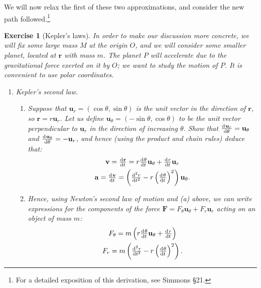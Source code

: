 \documentclass[a4paper,leqno,9pt]{article}
\theoremstyle{exercise}
\newtheorem{Exercise}{Exercise}
\newenvironment{exercise}
  {\begin{mdframed}\begin{Exercise}}
  {\end{Exercise}\end{mdframed}}
\theoremstyle{plain}
\theoremstyle{definition}
\theoremstyle{remark}
\renewcommand\vec{\mathbf}
\begin{document}
We will now relax the first of these two approximations, and consider the new path followed.\footnote{For a detailed
exposition of this derivation, see Simmons \S21.}
\begin{exercise}[Kepler's laws]
  In order to make our discussion more concrete, we will fix some large mass $ M $ at the origin $ O $, and we
  will consider some smaller planet, located at $ \vec{r} $ with mass $ m $. The planet $ P $ will accelerate due to
  the gravitational force exerted on it by $ O $; we want to study the motion of $ P $. It is convenient to use
  polar coordinates.

  \begin{enumerate}
    \item Kepler's second law.
      \begin{enumerate}
        \item Suppose that $ \vec{u}_r = (\cos \theta, \sin \theta) $ is the unit vector in the direction of $ \vec{r} $, so $ \vec{r} = r\vec{u}_r $.
              Let us define $ \vec{u}_\theta = (-\sin\theta, \cos \theta) $ to be the unit vector perpendicular to $ \vec{u}_r $ in the direction
              of increasing $ \theta $. Show that $ \od{\vec{u}_r}{\theta} = \vec{u}_\theta $ and $ \od{\vec{u}_\theta}{\theta} = -\vec{u}_r $, and hence (using
              the product and chain rules) deduce that:
              \begin{gather*}
                \vec{v} = \od{\vec{r}}{t} = r \od{\theta}{t} \vec{u}_\theta + \od{r}{t} \vec{u}_r\\
                \vec{a} = \od{\vec{v}}{t} = \left( \od[2]{r}{t} - r \left(\od{\theta}{t}\right)^2 \right)\vec{u}_\theta.
              \end{gather*}
        \item Hence, using Newton's second law of motion and (a) above, we can write expressions for the components of the
              force $ \vec{F} = F_\theta \vec{u}_\theta + F_r \vec{u}_r $ acting on an object of mass $ m $:
              \begin{gather*}
                F_\theta = m\left(r \od{\theta}{t} \vec{u}_\theta + \od{r}{t} \right)\\
                F_r = m\left( \od[2]{r}{t} - r \left(\od{\theta}{t}\right)^2 \right).
              \end{gather*}


\end{enumerate}
\end{enumerate}
\end{exercise}
\end{document}
